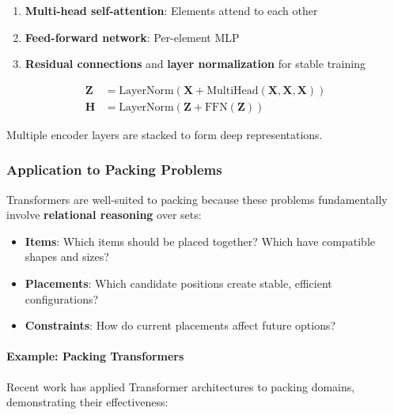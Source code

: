 \begin{enumerate}
\item \textbf{Multi-head self-attention}: Elements attend to each other
\item \textbf{Feed-forward network}: Per-element MLP
\item \textbf{Residual connections} and \textbf{layer normalization} for stable training
\end{enumerate}

\begin{align}
\mathbf{Z} &= \text{LayerNorm}(\mathbf{X} + \text{MultiHead}(\mathbf{X}, \mathbf{X}, \mathbf{X})) \\
\mathbf{H} &= \text{LayerNorm}(\mathbf{Z} + \text{FFN}(\mathbf{Z}))
\end{align}

Multiple encoder layers are stacked to form deep representations.

\subsubsection{Application to Packing Problems}

Transformers are well-suited to packing because these problems fundamentally involve \textbf{relational reasoning} over sets:

\begin{itemize}
\item \textbf{Items}: Which items should be placed together? Which have compatible shapes and sizes?
\item \textbf{Placements}: Which candidate positions create stable, efficient configurations?
\item \textbf{Constraints}: How do current placements affect future options?
\end{itemize}

\paragraph{Example: Packing Transformers}

Recent work has applied Transformer architectures to packing domains, demonstrating their effectiveness:

